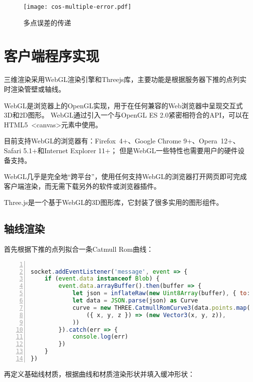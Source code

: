 \begin{figure}[H]
\centering
\texttt{[image: cos-multiple-error.pdf]}
\caption{多点误差的传递}
\label{fig:cos-multiple-error}
\end{figure}


\section{客户端程序实现}

三维渲染采用WebGL渲染引擎和Threejs库，主要功能是根据服务器下推的点列实时渲染管壁或轴线。

WebGL是浏览器上的OpenGL实现，用于在任何兼容的Web浏览器中呈现交互式3D和2D图形\cite{webgl}。
WebGL通过引入一个与OpenGL ES 2.0紧密相符合的API，可以在HTML5 <canvas>元素中使用。

目前支持WebGL的浏览器有：Firefox 4+、Google Chrome 9+、Opera 12+、Safari 5.1+和Internet Explorer 11+；
但是WebGL一些特性也需要用户的硬件设备支持。

WebGL几乎是完全地“跨平台”，使用任何支持WebGL的浏览器打开网页即可完成客户端渲染，而无需下载另外的软件或浏览器插件。

Three.js是一个基于WebGL的3D图形库\cite{threejs}，它封装了很多实用的图形组件。

\subsection{轴线渲染}

首先根据下推的点列拟合一条Catmull Rom曲线：

\begin{lstlisting}[language=JavaScript,
   backgroundcolor=\color{lightgray},
   extendedchars=true,
   basicstyle=\footnotesize\ttfamily,
   showstringspaces=false,
   showspaces=false,
   numbers=left,
   numberstyle=\footnotesize,
   numbersep=9pt,
   tabsize=2,
   breaklines=true,
   showtabs=false,
   captionpos=b]

socket.addEventListener('message', event => {
    if (event.data instanceof Blob) {
        event.data.arrayBuffer().then(buffer => {
            let json = inflateRaw(new Uint8Array(buffer), { to: 'string' })
            let data = JSON.parse(json) as Curve
            curve = new THREE.CatmullRomCurve3(data.points.map(
                ({ x, y, z }) => (new Vector3(x, y, z)),
            ))
        }).catch(err => {
            console.log(err)
        })
    }
})
\end{lstlisting}

再定义基础线材质，根据曲线和材质渲染形状并填入缓冲形状：

